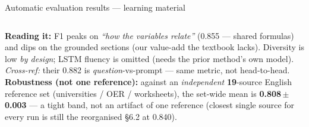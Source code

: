 \documentclass[aspectratio=169,10pt]{beamer}
\newcommand{\hl}[1]{{\bfseries\color{cAccent}#1}}
\begin{document}
\begin{frame}{Automatic evaluation results --- learning material}
\begin{columns}[T]
\end{columns}
\vspace{0.3em}
{\scriptsize \textbf{Reading it:} F1 peaks on \emph{``how the variables relate''} (0.855 --- shared formulas) and dips on the grounded sections (our value-add the textbook lacks). Diversity is low \emph{by design}; LSTM fluency is omitted (needs the prior method's own model). \emph{Cross-ref:} their 0.882 is \emph{question}-vs-prompt --- same metric, not head-to-head.}\\[2pt]
{\scriptsize \textbf{Robustness (not one reference):} against an \emph{independent} \hl{19}-source English reference set (universities / OER / worksheets), the set-wide mean is \hl{0.808\,$\pm$\,0.003} --- a tight band, not an artifact of one reference (closest single source for every run is still the reorganised \S6.2 at 0.840).}
\end{frame}
\end{document}
